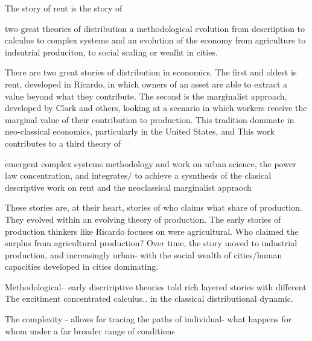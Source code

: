 The story of rent is the story of 

two great theories of distribution
a methodological evolution from descriiption to calculus to complex systems and an evolution of the economy 
from agriculture to indsutrial produciton, to social scaling or wealht in cities. 



There are two great stories of distribution in economics. The first and oldest is rent, %
developed in Ricardo, in which owners of an asset are able to extract a value beyond what they contribute. 
The second is the marginalist approach, developed by Clark and others, looking at a scenario in which workers receive the marginal value of their contribution to production. This tradition dominate in neo-classical economics, particularly in the United States, and %
This work contributes to a third theory of 

emergent complex systems methodology and  work on urban science, the power law concentration, and integrates/ to achieve a sysnthesis of  the clasical descriptive work on rent and the neoclassical marginalist appraoch

These stories are, at their heart, stories of who claims what share of production. They evolved within an evolving theory of production. The early stories of production thinkers like Ricardo focuses on were agricultural. Who claimed the surplus from agricultural production? Over time, the story moved to industrial production, and increasingly urban- with the social wealth of cities/human capacities developed in cities dominating. %



Methodological-- early discririptive theories told rich layered stories with different
The excitiment concentrated  calculus.. in the classical distributional dynamic.

The complexity - allows for tracing the paths of individual- what happens for whom under a far broader range of conditions

